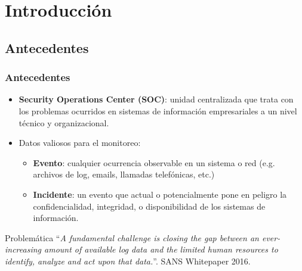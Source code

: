 

\iffalse
\section{Introducción}
\subsection{Antecedentes}
\watermarkoff
\begin{frame}[t,fragile]
	\frametitle {Antecedentes}
		\begin{itemize}
			\item \textbf{Security Operations Center (SOC)}: unidad centralizada que trata con los problemas ocurridos en sistemas de información empresariales a un nivel técnico y organizacional. %
			\pause
			\item Datos valiosos para el monitoreo:
			\pause
			\begin{itemize}
				\item \textbf{Evento}: cualquier ocurrencia observable en un sistema o red (e.g. archivos de log, emails, llamadas telefónicas, etc.)
				\pause
				\item \textbf{Incidente}: un evento que actual o potencialmente pone en peligro la confidencialidad, integridad, o disponibilidad de los sistemas de información.
			\end{itemize}
			
		\end{itemize}
	
	\pause
	
	\begin{block}{Problemática}
		``\textit{A fundamental challenge is closing the gap between an ever-increasing amount of available log data and the limited human resources to identify, analyze and act upon that data.}''. SANS Whitepaper 2016.
	\end{block}
\end{frame}
\watermarkon
